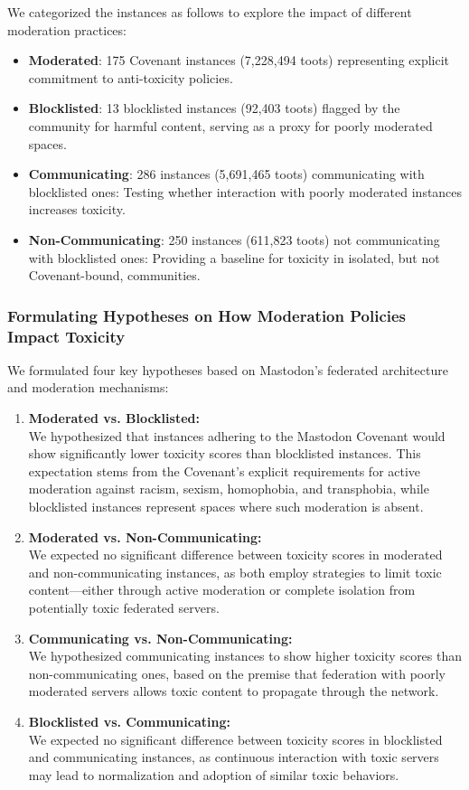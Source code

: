 We categorized the instances as follows to explore the impact of different moderation practices:
\begin{itemize}
\item \textbf{Moderated}: 175 Covenant instances (7,228,494 toots) representing explicit commitment to anti-toxicity policies.
\item \textbf{Blocklisted}: 13 blocklisted instances (92,403 toots) flagged by the community for harmful content, serving as a proxy for poorly moderated spaces.
\item \textbf{Communicating}: 286 instances (5,691,465 toots) communicating with blocklisted ones: Testing whether interaction with poorly moderated instances increases toxicity.
\item \textbf{Non-Communicating}: 250 instances (611,823 toots) not communicating with blocklisted ones: Providing a baseline for toxicity in isolated, but not Covenant-bound, communities.
\end{itemize}

\subsubsection{Formulating Hypotheses on How Moderation Policies Impact Toxicity}
We formulated four key hypotheses based on Mastodon's federated architecture and moderation mechanisms:

\begin{enumerate}
    \item \textbf{Moderated vs. Blocklisted:} \\
    We hypothesized that instances adhering to the Mastodon Covenant would show significantly lower toxicity scores than blocklisted instances. This expectation stems from the Covenant's explicit requirements for active moderation against racism, sexism, homophobia, and transphobia, while blocklisted instances represent spaces where such moderation is absent.

    \item \textbf{Moderated vs. Non-Communicating:} \\
    We expected no significant difference between toxicity scores in moderated and non-communicating instances, as both employ strategies to limit toxic content—either through active moderation or complete isolation from potentially toxic federated servers.

    \item \textbf{Communicating vs. Non-Communicating:} \\
    We hypothesized communicating instances to show higher toxicity scores than non-communicating ones, based on the premise that federation with poorly moderated servers allows toxic content to propagate through the network.

    \item \textbf{Blocklisted vs. Communicating:} \\
    We expected no significant difference between toxicity scores in blocklisted and communicating instances, as continuous interaction with toxic servers may lead to normalization and adoption of similar toxic behaviors.
\end{enumerate}


